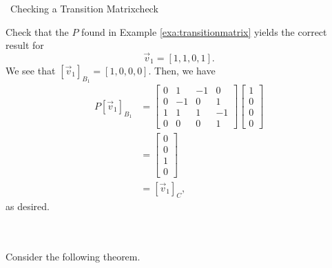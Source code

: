         \begin{example}{\Difficulty\,\Difficulty\,\,Checking a Transition Matrix}{check}

            Check that the \(P\) found in Example \ref{exa:transitionmatrix} yields the correct result for 
            \begin{equation*}
                \vec{v}_1=[1,1,0,1].
            \end{equation*}
            We see that \([\vec{v}_1]_{B_1}=[1,0,0,0]\). Then, we have
            \begin{align*}
                P[\vec{v}_1]_{B_1}&=\begin{bmatrix}
                    0 & 1 & -1 & 0 \\
                    0 & -1 & 0 & 1 \\
                    1 & 1 & 1 & -1 \\
                    0 & 0 & 0 & 1
                \end{bmatrix}\begin{bmatrix}
                    1 \\ 0 \\ 0 \\ 0
                \end{bmatrix} \\
                &=\begin{bmatrix}
                    0 \\ 0 \\ 1 \\ 0
                \end{bmatrix} \\
                &=[\vec{v}_1]_C,
            \end{align*}
            as desired.
            
        \end{example}
        \vphantom
        \\
        \\
        Consider the following theorem.
